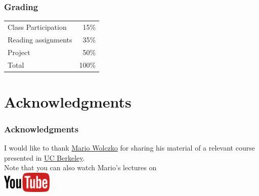 \documentclass[
14pt,
aspectratio=169,
usenames,
dvipsnames,
x11names]{beamer}
\begin{document}
\begin{frame}
  \frametitle{Grading}
  \centering
  \begin{tabular}{l r}
     Class Participation & 15\%               \\
     Reading assignments & 35\%               \\
     Project             & 50\%   \\
    \hline Total                     & 100\%              \\
  \end{tabular}
\end{frame}

\section{Acknowledgments}

\begin{frame}
  \frametitle{Acknowledgments}
  \centering
  \large
  I would like to thank \href{http://www.wolczko.com/CS294}{\alert{Mario Wolczko}} for sharing his material of a relevant course presented in \href{http://www.wolczko.com/CS294/}{\alert{UC Berkeley}}.\\[1em]

  Note that you can also watch Mario's lectures on\\[1em]
  \href{https://www.youtube.com/channel/UCKvk5mv6aIDS9zNh-vI1s5Q/videos}{\includegraphics[height=1cm]{youtube}}
\end{frame}


\end{document}
